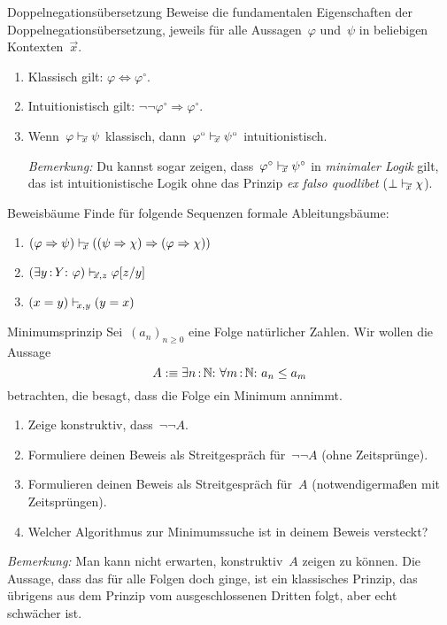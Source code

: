\documentclass{pizzablatt}
\begin{document}

\begin{aufgabe}{Doppelnegationsübersetzung}
Beweise die fundamentalen Eigenschaften der Doppelnegationsübersetzung, jeweils für alle
Aussagen~$\varphi$ und~$\psi$ in beliebigen Kontexten~$\vec x$.
\begin{enumerate}
\item Klassisch gilt: $\varphi \Longleftrightarrow \varphi^\circ$.
\item Intuitionistisch gilt: $\neg\neg\varphi^\circ \Longrightarrow
\varphi^\circ$.
\item Wenn~$\varphi \mathrel{\vdash\!\!\!_{\vec x}} \psi$ klassisch, dann~$\varphi^\circ \mathrel{\vdash\!\!\!_{\vec
x}} \psi^\circ$ intuitionistisch.

\emph{Bemerkung:} Du kannst sogar zeigen, dass~$\varphi^\circ \mathrel{\vdash\!\!\!_{\vec x}}
\psi^\circ$ in \emph{minimaler Logik} gilt, das ist intuitionistische Logik
ohne das Prinzip \emph{ex falso quodlibet} ($\bot \mathrel{\vdash\!\!\!_{\vec x}} \chi$).
\end{enumerate}
\end{aufgabe}

\begin{aufgabe}{Beweisbäume}
Finde für folgende Sequenzen formale Ableitungsbäume:
\begin{enumerate}
\item $(\varphi \Rightarrow \psi) \mathrel{\vdash\!\!\!_{\vec x}} ((\psi \Rightarrow \chi)
\Rightarrow (\varphi \Rightarrow \chi))$
\item $(\exists y\,{:}\,Y{:}\ \varphi) \mathrel{\vdash\!\!\!_{\vec x,z}} \varphi[z/y]$
\item $(x = y) \mathrel{\vdash\!\!\!_{x,y}} (y = x)$
\end{enumerate}
\end{aufgabe}

\begin{aufgabe}{Minimumsprinzip}
Sei~$(a_n)_{n \geq 0}$ eine Folge natürlicher Zahlen. Wir wollen die Aussage
\[ A :\equiv \exists n\?\NN{:}\ \forall m\?\NN{:}\ a_n \leq a_m \]
betrachten, die besagt, dass die Folge ein Minimum annimmt.

\begin{enumerate}
\item Zeige konstruktiv, dass~$\neg\neg A$.
\item Formuliere deinen Beweis als Streitgespräch für~$\neg\neg A$ (ohne
Zeitsprünge).
\item Formulieren deinen Beweis als Streitgespräch für~$A$ (notwendigermaßen
mit Zeitsprüngen).
\item Welcher Algorithmus zur Minimumssuche ist in deinem Beweis versteckt?
\end{enumerate}

\emph{Bemerkung:} Man kann nicht erwarten,
konstruktiv~$A$ zeigen zu können. Die Aussage, dass das für alle Folgen doch
ginge, ist ein klassisches Prinzip, das übrigens aus dem Prinzip vom
ausgeschlossenen Dritten folgt, aber echt schwächer ist.

\end{aufgabe}
\end{document}
